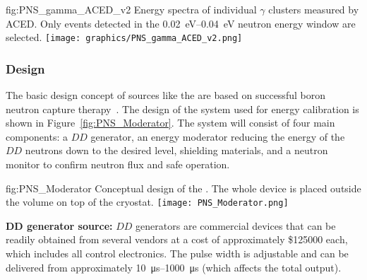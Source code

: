 \begin{dunefigure}{fig:PNS_gamma_ACED_v2}
{Energy spectra of individual $\gamma$ clusters measured by ACED. Only events detected in the \SIrange{0.02}{0.04}{eV} neutron energy window are selected.}
\texttt{[image: graphics/PNS\_gamma\_ACED\_v2.png]}
\end{dunefigure}


\subsubsection{Design}
\label{sec:dp-calib-sys-pns-des}

The basic design concept of sources like the  are based on successful boron neutron capture therapy~\cite{bib:Koivunoro2004}. The design of the  system used for energy calibration is shown in Figure~\ref{fig:PNS_Moderator}. The system will consist of four main components: a $DD$ generator, an energy moderator reducing the energy of the $DD$ neutrons down to the desired level, shielding materials, and a neutron monitor to confirm neutron flux and safe operation. 

\begin{dunefigure}{fig:PNS_Moderator}
{Conceptual design of the . The whole device is placed outside the  volume on top of the cryostat.}
\texttt{[image: PNS\_Moderator.png]}
\end{dunefigure}

{\bf DD generator source:} %
$DD$ generators are commercial devices that can be readily obtained from several vendors at a cost of approximately \$\num{125000} each, which includes all control electronics. The pulse width is adjustable and can be delivered from approximately \SIrange{10}{1000}{\micro\s} (which affects the total output). 

